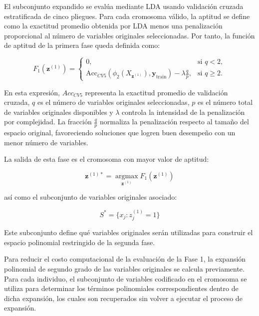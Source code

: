 El subconjunto expandido se evalúa mediante LDA usando validación cruzada estratificada de cinco pliegues. Para cada cromosoma válido, la aptitud se define como la exactitud promedio obtenida por LDA menos una penalización proporcional al número de variables originales seleccionadas. Por tanto, la función de aptitud de la primera fase queda definida como:

\begin{equation}
	F_1(\mathbf{z}^{(1)}) = 
	\begin{cases} 
		0, & \text{si } q < 2, \\
		\text{Acc}_{CV5}(\phi_2(X_{\mathbf{z}^{(1)}}), \mathbf{y}_{\text{train}}) - \lambda \frac{q}{p}, & \text{si } q \geq 2.
	\end{cases}
	\label{eq:EM4}
\end{equation}

En esta expresión, $Acc_{CV5}$ representa la exactitud promedio de validación cruzada, $q$ es el número de variables originales seleccionadas, $p$ es el número total de variables originales disponibles y $\lambda$ controla la intensidad de la penalización por complejidad. La fracción $\frac{q}{p}$ normaliza la penalización respecto al tamaño del espacio original, favoreciendo soluciones que logren buen desempeño con un menor número de variables.

La salida de esta fase es el cromosoma con mayor valor de aptitud:

\begin{equation}
	\mathbf{z}^{(1)*} = \operatorname*{argmax}_{\mathbf{z}^{(1)}} F_1(\mathbf{z}^{(1)})
	\label{eq:EM5}
\end{equation}

así como el subconjunto de variables originales asociado:

\begin{equation}
	S^* = \{x_j:z_j^{(1)}=1\}
	\label{eq:EM6}
\end{equation}

Este subconjunto define qué variables originales serán utilizadas para construir el espacio polinomial restringido de la segunda fase.

Para reducir el costo computacional de la evaluación de la Fase 1, la expansión polinomial de segundo grado de las variables originales se calcula previamente. Para cada individuo, el subconjunto de variables codificado en el cromosoma se utiliza para determinar los términos polinomiales correspondientes dentro de dicha expansión, los cuales son recuperados sin volver a ejecutar el proceso de expansión.

